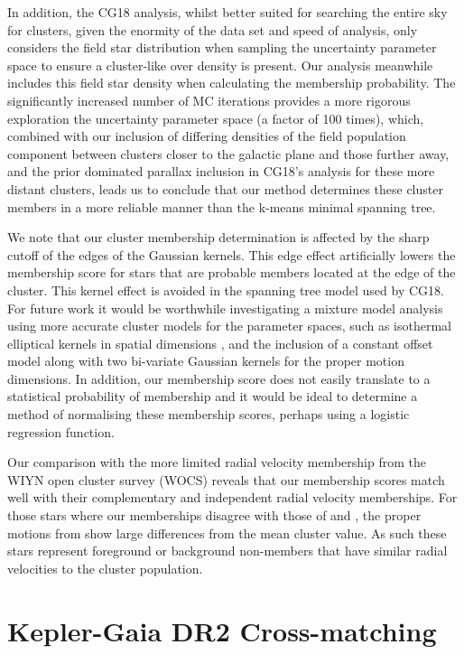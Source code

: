 In addition, the CG18 analysis, whilst better suited for searching the entire sky for clusters, given the enormity of the data set and speed of analysis, only considers the field star distribution when sampling the uncertainty parameter space to ensure a cluster-like over density is present. Our analysis meanwhile includes this field star density when calculating the membership probability. The significantly increased number of MC iterations provides a more rigorous exploration the uncertainty parameter space (a factor of 100 times), which, combined with our inclusion of differing densities of the field population component between clusters closer to the galactic plane and those further away, and the prior dominated parallax inclusion in CG18's analysis for these more distant clusters, leads us to conclude that our method determines these cluster members in a more reliable manner than the k-means minimal spanning tree.

We note that our cluster membership determination is affected by the sharp cutoff of the edges of the Gaussian kernels. This edge effect artificially lowers the membership score for stars that are probable members located at the edge of the cluster. This kernel effect is avoided in the spanning tree model used by CG18. For future work it would be worthwhile investigating a mixture model analysis using more accurate cluster models for the parameter spaces, such as isothermal elliptical kernels in spatial dimensions \citep{kuhn_mixture_2017}, and the inclusion of a constant offset model along with two bi-variate Gaussian kernels for the proper motion dimensions. In addition, our membership score does not easily translate to a statistical probability of membership and it would be ideal to determine a method of normalising these membership scores, perhaps using a logistic regression function.

Our comparison with the more limited radial velocity membership from the WIYN open cluster survey (WOCS) reveals that our membership scores match well with their complementary and independent radial velocity memberships. For those stars where our memberships disagree with those of \citet{tofflemire_wiyn_2014} and \citet{hole_wiyn_2009}, the proper motions from \Gaia{} show large differences from the mean cluster value. As such these stars represent foreground or background non-members that have similar radial velocities to the cluster population.

\section{Kepler-Gaia DR2 Cross-matching}

